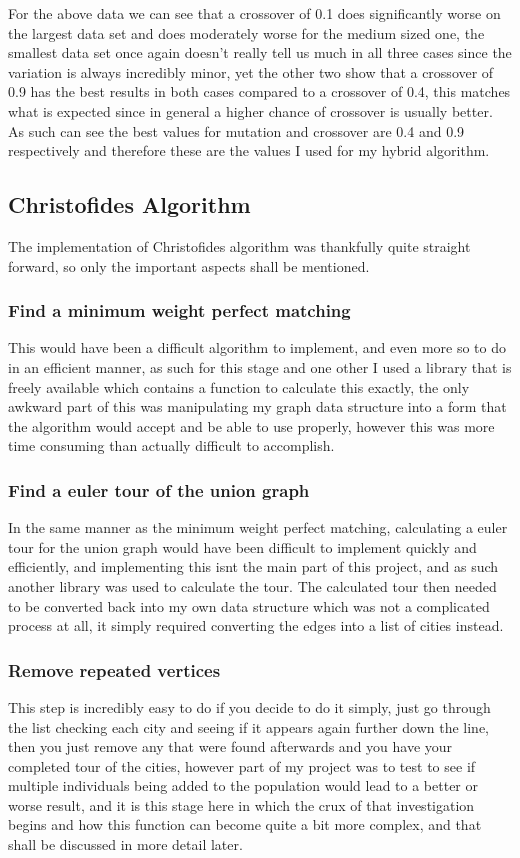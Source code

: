 \documentclass[11pt,a4paper,titlepage]{article}
\begin{document}
For the above data we can see that a crossover of 0.1 does significantly worse on the largest data set and does moderately worse for the medium sized one, the smallest data set once again doesn't really tell us much in all three cases since the variation is always incredibly minor, yet the other two show that a crossover of 0.9 has the best results in both cases compared to a crossover of 0.4, this matches what is expected since in general a higher chance of crossover is usually better. As such can see the best values for mutation and crossover are 0.4 and 0.9 respectively and therefore these are the values I used for my hybrid algorithm.

\subsection{Christofides Algorithm}
The implementation of Christofides algorithm was thankfully quite straight forward, so only the important aspects shall be mentioned.

\subsubsection{Find a minimum weight perfect matching}
This would have been a difficult algorithm to implement, and even more so to do in an efficient manner, as such for this stage and one other I used a library that is freely available \cite{KolMinMatch} which contains a function to calculate this exactly, the only awkward part of this was manipulating my graph data structure into a form that the algorithm would accept and be able to use properly, however this was more time consuming than actually difficult to accomplish.

\subsubsection{Find a euler tour of the union graph}
In the same manner as the minimum weight perfect matching, calculating a euler tour for the union graph would have been difficult to implement quickly and efficiently, and implementing this isnt the main part of this project, and as such another library was used \cite{HeirEulTour} to calculate the tour. The calculated tour then needed to be converted back into my own data structure which was not a complicated process at all, it simply required converting the edges into a list of cities instead.

\subsubsection{Remove repeated vertices}
This step is incredibly easy to do if you decide to do it simply, just go through the list checking each city and seeing if it appears again further down the line, then you just remove any that were found afterwards and you have your completed tour of the cities, however part of my project was to test to see if multiple individuals being added to the population would lead to a better or worse result, and it is this stage here in which the crux of that investigation begins and how this function can become quite a bit more complex, and that shall be discussed in more detail later.
\end{document}
